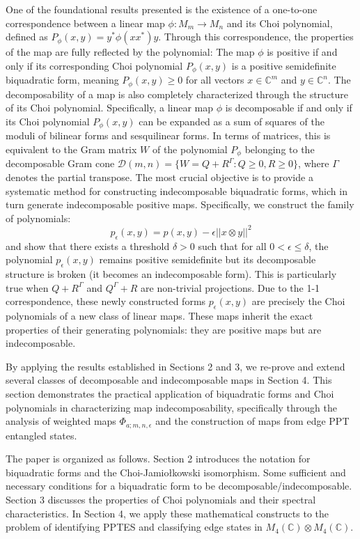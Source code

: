 \documentclass[12pt,a4paper]{amsart}
\theoremstyle{plain}
\theoremstyle{remark}
\theoremstyle{definition}
\begin{document}
One of the foundational results presented is the existence of a one-to-one correspondence between a linear map $\phi: M_m \to M_n$ and its Choi polynomial, defined as $P_\phi(x,y) = y^*\phi(xx^*)y$. 
Through this correspondence, the properties of the map are fully reflected by the polynomial: The map $\phi$ is positive if and only if its corresponding Choi polynomial $P_\phi(x,y)$ is a positive semidefinite biquadratic form, meaning $P_\phi(x,y) \ge 0$ for all vectors $x \in \mathbb{C}^m$ and $y \in \mathbb{C}^n$.
The decomposability of a map is also completely characterized through the structure of its Choi polynomial. Specifically, a linear map $\phi$ is decomposable if and only if its Choi polynomial $P_\phi(x,y)$ can be expanded as a sum of squares of the moduli of bilinear forms and sesquilinear forms. 
In terms of matrices, this is equivalent to the Gram matrix $W$ of the polynomial $P_\phi$ belonging to the decomposable Gram cone $\mathcal{D}(m,n) = \{W = Q + R^\Gamma : Q \ge 0, R \ge 0\}$, where $\Gamma$ denotes the partial transpose.
The most crucial objective is to provide a systematic method for constructing indecomposable biquadratic forms, which in turn generate indecomposable positive maps. Specifically, we construct the family of polynomials:
\[
p_\epsilon(x,y) = p(x,y) - \epsilon||x \otimes y||^2
\] 
and show that there exists a threshold $\delta > 0$ such that for all $0 < \epsilon \le \delta$, the polynomial $p_\epsilon(x,y)$ remains positive semidefinite but its decomposable structure is broken (it becomes an indecomposable form). This is particularly true when $Q+R^\Gamma$ and $Q^\Gamma+R$ are non-trivial projections.
Due to the 1-1 correspondence, these newly constructed forms $p_\epsilon(x,y)$ are precisely the Choi polynomials of a new class of linear maps. These maps inherit the exact properties of their generating polynomials: they are positive maps but are indecomposable.

By applying the results established in Sections 2 and 3, we re-prove and extend several classes of decomposable and indecomposable maps in Section 4. This section demonstrates the practical application of biquadratic forms and Choi polynomials in characterizing map indecomposability, specifically through the analysis of weighted maps $\Phi_{a;m,n,\epsilon}$ and the construction of maps from edge PPT entangled states.

The paper is organized as follows. Section 2 introduces the notation for biquadratic forms and the Choi-Jamiołkowski isomorphism. Some sufficient and necessary conditions for a biquadratic form to be decomposable/indecomposable. Section 3 discusses the properties of Choi polynomials and their spectral characteristics. In Section 4, we apply these mathematical constructs to the problem of identifying PPTES and classifying edge states in $M_4(\mathbb{C}) \otimes M_4(\mathbb{C})$.
\end{document}
